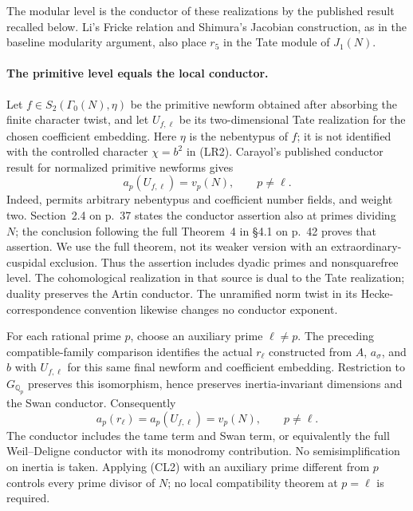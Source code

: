 The modular level is the conductor of these realizations by the
published result recalled below. Li's Fricke relation and Shimura's
Jacobian construction, as in the baseline modularity argument, also
place $r_5$ in the Tate module of $J_1(N)$.

\paragraph{The primitive level equals the local conductor.}
Let $f\in S_2(\Gamma_0(N),\eta)$ be the primitive newform obtained
after absorbing the finite character twist, and let $U_{f,\ell}$
be its two-dimensional Tate realization for the chosen coefficient
embedding. Here $\eta$ is the nebentypus of $f$; it is not identified
with the controlled character $\chi=b^2$ in (LR2).
Carayol's published conductor result for normalized primitive
newforms gives
\[
 a_p(U_{f,\ell})=v_p(N),\qquad p\ne\ell.
\tag{CL1}
\]
Indeed, \cite[\S2.1, p.~36]{carayol1987} permits arbitrary
nebentypus and coefficient number fields, and weight two.
Section~2.4 on p.~37 states the conductor assertion also at primes
dividing $N$; the conclusion following the full Theorem~4 in
\S4.1 on p.~42 proves that assertion. We use the full theorem,
not its weaker version with an extraordinary-cuspidal exclusion.
Thus the assertion includes dyadic primes and nonsquarefree level.
The cohomological realization in that source is dual to the Tate
realization; duality preserves the Artin conductor. The unramified
norm twist in its Hecke-correspondence convention likewise changes
no conductor exponent.

For each rational prime $p$, choose an auxiliary prime $\ell\ne p$.
The preceding compatible-family comparison identifies the actual
$r_\ell$ constructed from $A$, $a_\sigma$, and $b$ with
$U_{f,\ell}$ for this same final newform and coefficient embedding.
Restriction to $G_{\mathbb Q_p}$ preserves this isomorphism, hence
preserves inertia-invariant dimensions and the Swan conductor.
Consequently
\[
 a_p(r_\ell)=a_p(U_{f,\ell})=v_p(N),\qquad p\ne\ell.
\tag{CL2}
\]
The conductor includes the tame term and Swan term, or equivalently
the full Weil--Deligne conductor with its monodromy contribution.
No semisimplification on inertia is taken. Applying (CL2) with an
auxiliary prime different from $p$ controls every prime divisor of
$N$; no local compatibility theorem at $p=\ell$ is required.

